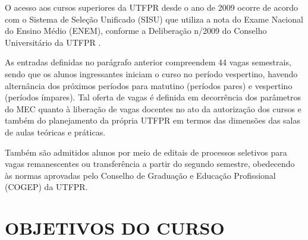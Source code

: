 O acesso aos cursos superiores da UTFPR desde o ano de 2009 ocorre de acordo com o Sistema de Seleção Unificado (SISU) que utiliza a nota do Exame Nacional do Ensino Médio (ENEM), conforme a Deliberação n/2009 do Conselho Universitário da UTFPR \cite{sisuutfpr}.


As entradas definidas no parágrafo anterior compreendem 44 vagas semestrais, sendo que os alunos ingressantes iniciam o curso no período vespertino, havendo alternância dos próximos períodos para matutino (períodos pares) e vespertino (períodos ímpares). Tal oferta de vagas é definida em decorrência dos parâmetros do MEC quanto à liberação de vagas docentes no ato da autorização dos cursos e também do planejamento da própria UTFPR em termos das dimensões das salas de aulas teóricas e práticas.

Também são admitidos alunos por meio de editais de processos seletivos para vagas remanescentes ou transferência a partir do segundo semestre, obedecendo às normas aprovadas pelo Conselho de Graduação e Educação Profissional (COGEP) da UTFPR.

\section{OBJETIVOS DO CURSO}
\label{sec:obj}


